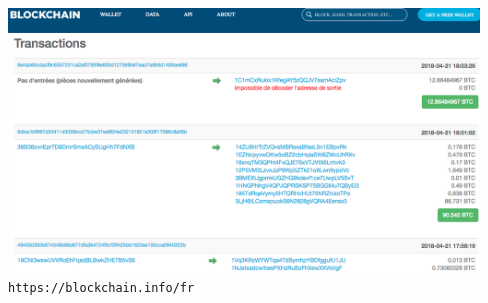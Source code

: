 
\begin{frame}{}

\begin{columns}
\column{\dimexpr\paperwidth-1pt}

\begin{center}
\vskip 1.0cm
\includegraphics[width=12.5cm,height=7.0cm]{graphics/Bloc-bitcoin-519291-transactions-01.png}
\vskip 0.1cm
{\tiny\texttt{https://blockchain.info/fr}}
\end{center}

\end{columns}

\normalsize
\end{frame}

